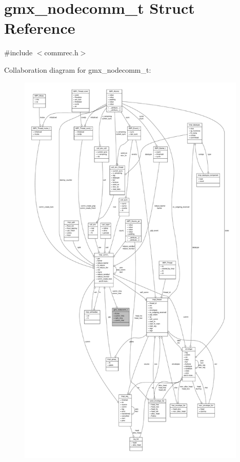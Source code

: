 \hypertarget{structgmx__nodecomm__t}{\section{gmx\-\_\-nodecomm\-\_\-t \-Struct \-Reference}
\label{structgmx__nodecomm__t}
}


{\ttfamily \#include $<$commrec.\-h$>$}



\-Collaboration diagram for gmx\-\_\-nodecomm\-\_\-t\-:
\nopagebreak
\begin{figure}[H]
\begin{center}
\leavevmode
\includegraphics[height=550pt]{structgmx__nodecomm__t__coll__graph}
\end{center}
\end{figure}
